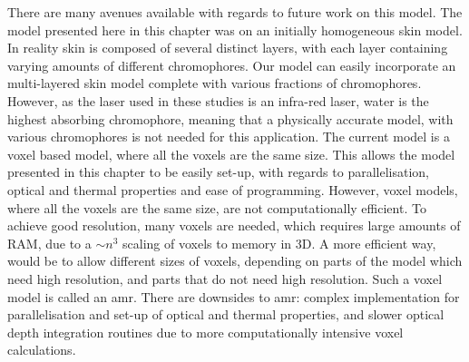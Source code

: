 There are many avenues available with regards to future work on this model. The model presented here in this chapter was on an initially homogeneous skin model. In reality skin is composed of several distinct layers, with each layer containing varying amounts of different chromophores. Our model can easily incorporate an multi-layered skin model complete with various fractions of chromophores. However, as the laser used in these studies is an infra-red laser, water is the highest absorbing chromophore, meaning that a physically accurate model, with various chromophores is not needed for this application.
The current model is a voxel based model, where all the voxels are the same size. This allows the model presented in this chapter to be easily set-up, with regards to parallelisation, optical and thermal properties and ease of programming. However, voxel models, where all the voxels are the same size, are not computationally efficient. To achieve good resolution, many voxels are needed, which requires large amounts of RAM, due to a $\sim n^3$ scaling of voxels to memory in 3D. A more efficient way, would be to allow different sizes of voxels, depending on parts of the model which need high resolution, and parts that do not need high resolution. Such a voxel model is called an \gls*{amr}. There are downsides to \gls*{amr}: complex implementation for parallelisation and set-up of optical and thermal properties, and slower optical depth integration routines due to more computationally intensive voxel calculations.


